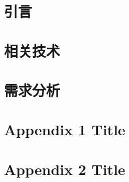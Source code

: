 \renewcommand{\abstractname}{\fontsize{18pt}{27pt}\selectfont\heiti{摘\hspace{2em}要}}
\begin{abstract}
    
\end{abstract}

\newpage

\renewcommand{\abstractname}{\fontsize{18pt}{27pt}\selectfont{Abstract}}
\begin{abstract}
    
\end{abstract}



\tableofcontents
\newpage

\chapter{引言}


\chapter{相关技术}


\chapter{需求分析}


\appendix

\chapter{Appendix 1 Title}


\chapter{Appendix 2 Title}


\newpage




